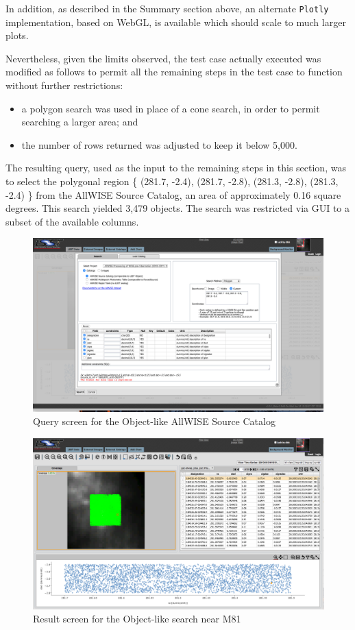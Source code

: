 In addition, as described in the Summary section above, an alternate \verb|Plotly| implementation, based on WebGL, is available which should scale to much larger plots.

Nevertheless, given the limits observed, the test case actually executed was modified as follows to permit all the remaining steps in the test case to function without further restrictions:

\begin{itemize}
\item{a polygon search was used in place of a cone search, in order to permit searching a larger area; and}
\item{the number of rows returned was adjusted to keep it below 5,000.}
\end{itemize}

The resulting query, used as the input to the remaining steps in this section,
was to select the polygonal region \{ (281.7, -2.4), (281.7, -2.8), (281.3, -2.8), (281.3, -2.4) \} from the AllWISE Source Catalog,
an area of approximately 0.16 square degrees.
This search yielded 3,479 objects.
The search was restricted via GUI to a subset of the available columns.

\begin{figure}
  \includegraphics[width=\linewidth]{lsp-00-20/step3Search_a.png}
  \caption{Query screen for the Object-like AllWISE Source Catalog}
  \label{fig:lsp-00-20-search}
\end{figure}

\begin{figure}
  \includegraphics[width=\linewidth]{lsp-00-20/step3Result_a.png}
  \caption{Result screen for the Object-like search near M81}
  \label{fig:lsp-00-20-result-table}
\end{figure}

